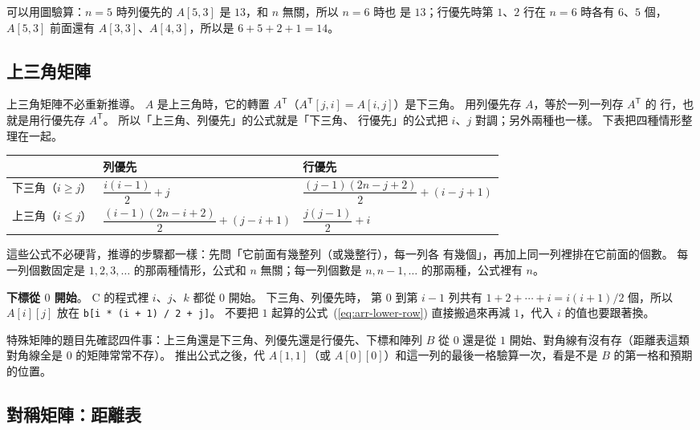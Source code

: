 可以用圖驗算：$n = 5$ 時列優先的 $A[5, 3]$ 是 $13$，和 $n$ 無關，所以 $n = 6$ 時也
是 $13$；行優先時第 $1$、$2$ 行在 $n = 6$ 時各有 $6$、$5$ 個，$A[5, 3]$ 前面還有
$A[3, 3]$、$A[4, 3]$，所以是 $6 + 5 + 2 + 1 = 14$。

\subsection{上三角矩陣}

上三角矩陣不必重新推導。 $A$ 是上三角時，它的轉置 $A^{\mathsf T}$（$A^{\mathsf
T}[j, i] = A[i, j]$）是下三角。 用列優先存 $A$，等於一列一列存 $A^{\mathsf T}$ 的
行，也就是用行優先存 $A^{\mathsf T}$。 所以「上三角、列優先」的公式就是「下三角、
行優先」的公式把 $i$、$j$ 對調；另外兩種也一樣。 下表把四種情形整理在一起。

\begin{center}
\renewcommand{\arraystretch}{1.6}
\begin{tabular}{lll}
\toprule
 & 列優先 & 行優先 \\
\midrule
下三角（$i \ge j$）& $\dfrac{i(i - 1)}{2} + j$ & $\dfrac{(j - 1)(2n - j + 2)}{2} + (i - j + 1)$ \\
上三角（$i \le j$）& $\dfrac{(i - 1)(2n - i + 2)}{2} + (j - i + 1)$ & $\dfrac{j(j - 1)}{2} + i$ \\
\bottomrule
\end{tabular}
\end{center}

這些公式不必硬背，推導的步驟都一樣：先問「它前面有幾整列（或幾整行），每一列各
有幾個」，再加上同一列裡排在它前面的個數。 每一列個數固定是 $1, 2, 3, \ldots$ 的那兩種情形，公式和
$n$ 無關；每一列個數是 $n, n - 1, \ldots$ 的那兩種，公式裡有 $n$。

\textbf{下標從 $0$ 開始}。 C 的程式裡 $i$、$j$、$k$ 都從 $0$ 開始。 下三角、列優先時，
第 $0$ 到第 $i - 1$ 列共有 $1 + 2 + \cdots + i = i(i + 1)/2$ 個，所以 $A[i][j]$
放在 \texttt{b[i * (i + 1) / 2 + j]}。 不要把 $1$ 起算的公式~(\ref{eq:arr-lower-row})
直接搬過來再減 $1$，代入 $i$ 的值也要跟著換。

\begin{examnote}
特殊矩陣的題目先確認四件事：上三角還是下三角、列優先還是行優先、下標和陣列 $B$ 從
$0$ 還是從 $1$ 開始、對角線有沒有存（距離表這類對角線全是 $0$ 的矩陣常常不存）。
推出公式之後，代 $A[1, 1]$（或 $A[0][0]$）和這一列的最後一格驗算一次，看是不是
$B$ 的第一格和預期的位置。
\end{examnote}

\subsection{對稱矩陣：距離表}

